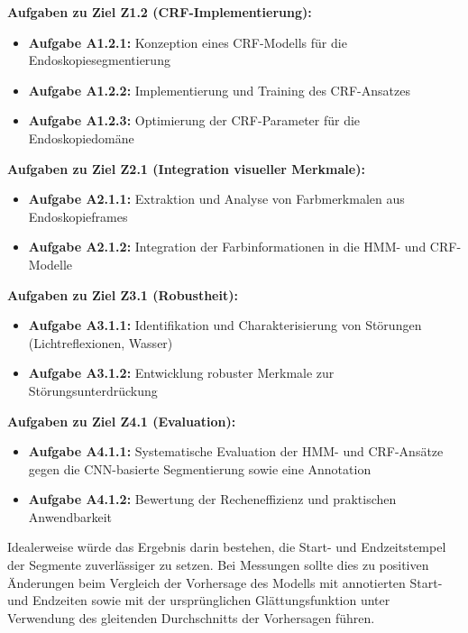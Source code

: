 \textbf{Aufgaben zu Ziel Z1.2 (CRF-Implementierung):}
\begin{itemize}
\item \textbf{Aufgabe A1.2.1:} Konzeption eines CRF-Modells für die Endoskopiesegmentierung
\item \textbf{Aufgabe A1.2.2:} Implementierung und Training des CRF-Ansatzes
\item \textbf{Aufgabe A1.2.3:} Optimierung der CRF-Parameter für die Endoskopiedomäne
\end{itemize}

\textbf{Aufgaben zu Ziel Z2.1 (Integration visueller Merkmale):}
\begin{itemize}
\item \textbf{Aufgabe A2.1.1:} Extraktion und Analyse von Farbmerkmalen aus Endoskopieframes
\item \textbf{Aufgabe A2.1.2:} Integration der Farbinformationen in die HMM- und CRF-Modelle
\end{itemize}

\textbf{Aufgaben zu Ziel Z3.1 (Robustheit):}
\begin{itemize}
\item \textbf{Aufgabe A3.1.1:} Identifikation und Charakterisierung von Störungen (Lichtreflexionen, Wasser)
\item \textbf{Aufgabe A3.1.2:} Entwicklung robuster Merkmale zur Störungsunterdrückung
\end{itemize}

\textbf{Aufgaben zu Ziel Z4.1 (Evaluation):}
\begin{itemize}
\item \textbf{Aufgabe A4.1.1:} Systematische Evaluation der HMM- und CRF-Ansätze gegen die CNN-basierte Segmentierung sowie eine Annotation
\item \textbf{Aufgabe A4.1.2:} Bewertung der Recheneffizienz und praktischen Anwendbarkeit
\end{itemize}

Idealerweise würde das Ergebnis darin bestehen, die Start- und Endzeitstempel der Segmente zuverlässiger zu setzen. Bei Messungen sollte dies zu positiven Änderungen beim Vergleich der Vorhersage des Modells mit annotierten Start- und Endzeiten sowie mit der ursprünglichen Glättungsfunktion unter Verwendung des gleitenden Durchschnitts der Vorhersagen führen.
